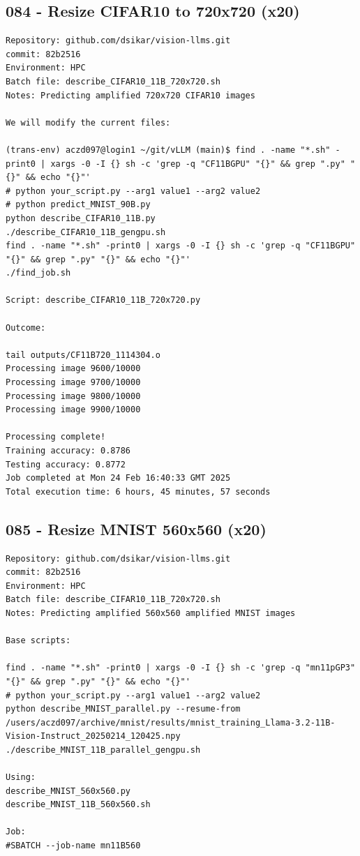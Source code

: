 \subsection{084 - Resize CIFAR10 to 720x720 (x20)}
\label{app_res:084}
\begin{verbatim}
Repository: github.com/dsikar/vision-llms.git
commit: 82b2516
Environment: HPC 
Batch file: describe_CIFAR10_11B_720x720.sh
Notes: Predicting amplified 720x720 CIFAR10 images

We will modify the current files:

(trans-env) aczd097@login1 ~/git/vLLM (main)$ find . -name "*.sh" -print0 | xargs -0 -I {} sh -c 'grep -q "CF11BGPU" "{}" && grep ".py" "{}" && echo "{}"'
# python your_script.py --arg1 value1 --arg2 value2
# python predict_MNIST_90B.py
python describe_CIFAR10_11B.py
./describe_CIFAR10_11B_gengpu.sh
find . -name "*.sh" -print0 | xargs -0 -I {} sh -c 'grep -q "CF11BGPU" "{}" && grep ".py" "{}" && echo "{}"'
./find_job.sh

Script: describe_CIFAR10_11B_720x720.py

Outcome:

tail outputs/CF11B720_1114304.o
Processing image 9600/10000
Processing image 9700/10000
Processing image 9800/10000
Processing image 9900/10000

Processing complete!
Training accuracy: 0.8786
Testing accuracy: 0.8772
Job completed at Mon 24 Feb 16:40:33 GMT 2025
Total execution time: 6 hours, 45 minutes, 57 seconds

\end{verbatim}

\subsection{085 - Resize MNIST 560x560 (x20)}
\label{app_res:085}
\begin{verbatim}
Repository: github.com/dsikar/vision-llms.git
commit: 82b2516
Environment: HPC 
Batch file: describe_CIFAR10_11B_720x720.sh
Notes: Predicting amplified 560x560 amplified MNIST images

Base scripts:

find . -name "*.sh" -print0 | xargs -0 -I {} sh -c 'grep -q "mn11pGP3" "{}" && grep ".py" "{}" && echo "{}"'
# python your_script.py --arg1 value1 --arg2 value2
python describe_MNIST_parallel.py --resume-from /users/aczd097/archive/mnist/results/mnist_training_Llama-3.2-11B-Vision-Instruct_20250214_120425.npy
./describe_MNIST_11B_parallel_gengpu.sh

Using:
describe_MNIST_560x560.py
describe_MNIST_11B_560x560.sh

Job:
#SBATCH --job-name mn11B560

\end{verbatim}

